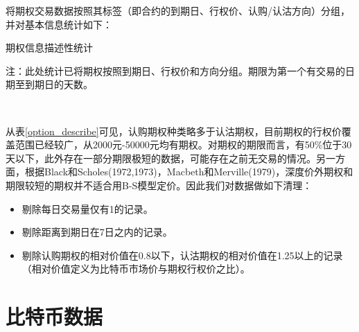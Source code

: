 \par{
将期权交易数据按照其标签（即合约的到期日、行权价、认购/认沽方向）分组，并对基本信息统计如下：
}
\par{
\begin{center}
\begin{threeparttable}[H]
\centering
\caption{期权信息描述性统计}
\label{option_describe}

\begin{tablenotes}
\footnotesize
\item 注：此处统计已将期权按照到期日、行权价和方向分组。期限为第一个有交易的日期至到期日的天数。
\end{tablenotes}
\end{threeparttable}
\end{center}
}
~\\
\par{
从表\ref{option_describe}可见，认购期权种类略多于认沽期权，目前期权的行权价覆盖范围已经较广，从2000元-50000元均有期权。对期权的期限而言，有50$\%$位于30天以下，此外存在一部分期限极短的数据，可能存在之前无交易的情况。另一方面，根据Black和Scholes(1972,1973)\cite{J-1972}\cite{10.2307/1831029}，Macbeth和Merville(1979)\cite{Jame-1979}，深度价外期权和期限较短的期权并不适合用B-S模型定价。因此我们对数据做如下清理：
\begin{itemize}
    \item 剔除每日交易量仅有1的记录。
    \item 剔除距离到期日在7日之内的记录。
    \item 剔除认购期权的相对价值在0.8以下，认沽期权的相对价值在1.25以上的记录（相对价值定义为比特币市场价与期权行权价之比）。
    
\end{itemize}
}
\section{比特币数据}

